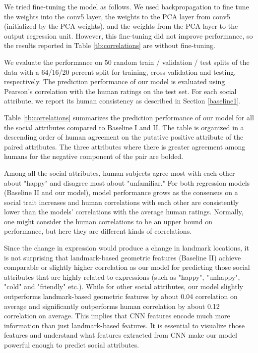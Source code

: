 \documentclass[10pt,twocolumn,letterpaper]{article}
\begin{document}
We tried fine-tuning the model as follows. We used backpropagation to fine tune the weights into the conv5 layer, the weights to the PCA layer from conv5 (initialized by the PCA weights), and the weights from the PCA layer to the output regression unit. However, this fine-tuning did not improve performance, so the results reported in Table \ref{tb:correlations} are without fine-tuning.

We evaluate the performance on 50 random train / validation / test splits of the data with a 64/16/20 percent split for training, cross-validation and testing, respectively. The prediction performance of our model is evaluated using Pearson's correlation with the human ratings on the test set. For each social attribute, we report its human consistency as described in Section \ref{baseline1}. 

Table \ref{tb:correlations} summarizes the prediction performance of our model for all the social attributes compared to Baseline I and II.
The table is organized in a descending order of human agreement on the putative positive attribute of the paired attributes. The three attributes where there is greater agreement among humans for the negative component of the pair are bolded.

Among all the social attributes, human subjects agree most with each other about "happy" and disagree most about "unfamiliar." For both regression models (Baseline II and our model), model performance grows as the consensus on a social trait increases and human correlations with each other are consistently lower than the models' correlations with the average human ratings. Normally, one might consider the human correlations to be an upper bound on performance, but here they are different kinds of correlations. 

Since the change in expression would produce a change in landmark locations, it is not surprising that landmark-based geometric features (Baseline II) achieve comparable or slightly higher correlation as our model for predicting those social attributes that are highly related to expressions (such as "happy", "unhappy", "cold" and "friendly" etc.). While for other social attributes, our model slightly outperforms landmark-based geometric features by about 0.04 correlation on average and significantly outperforms human correlation by about 0.12 correlation on average. This implies that CNN features encode much more information than just landmark-based features. It is essential to visualize those features and understand what features extracted from CNN make our model powerful enough to predict social attributes. 
\end{document}
